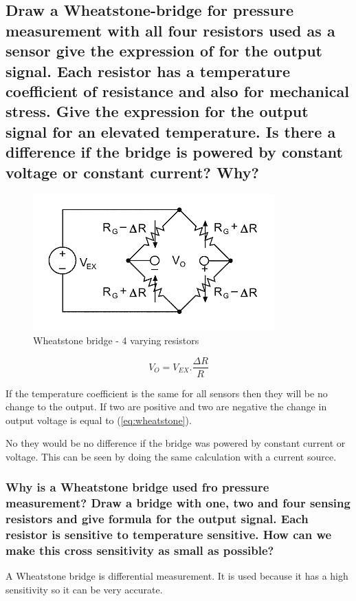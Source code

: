 \documentclass[10pt,a4paper]{article}
\begin{document}
\subsection{Draw a Wheatstone-bridge for pressure measurement with all four resistors used as a sensor give the expression of for the output signal. Each resistor has a temperature coefficient of resistance and also for mechanical stress. Give the expression for the output signal for an elevated temperature. Is there a difference if the bridge is powered by constant voltage or constant current? Why?}

\begin{figure}[h!]
    \centering
    \includegraphics{bridge.png}
    \caption{Wheatstone bridge - 4 varying resistors}
\end{figure}

\begin{equation} \label{eq:wheatstone}
	V_{O} = V_{EX}.\frac{\Delta R}{R}
\end{equation}

If the temperature coefficient is the same for all sensors then they will be no change to the output. If two are positive and two are negative the change in output voltage is equal to (\ref{eq:wheatstone}).

No they would be no difference if the bridge was powered by constant current or voltage. This can be seen by doing the same calculation with a current source.

\subsubsection{Why is a Wheatstone bridge used fro pressure measurement? Draw a bridge with one, two and four sensing resistors and give formula for the output signal. Each resistor is sensitive to temperature sensitive. How can we make this cross sensitivity as small as possible?}

A Wheatstone bridge is differential measurement. It is used because it has a high sensitivity so it can be very accurate.
\end{document}
